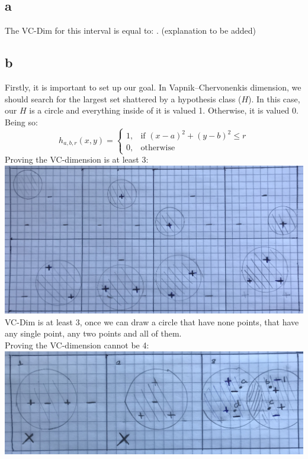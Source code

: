 \subsection{a}
The VC-Dim for this interval is equal to: \textbf{}. (explanation to be added)
\subsection{b}
Firstly, it is important to set up our goal. In Vapnik–Chervonenkis dimension, we should search for the largest set shattered by a hypothesis class ($H$). In this case, our $H$ is a circle and everything inside of it is valued 1. Otherwise, it is valued 0. Being so: \\
$$
h_{a,b,r}(x,y)=
        \begin{cases}
			1, & \text{if $(x-a)^2+(y-b)^2 \leq r$}\\
            0, & \text{otherwise}
		 \end{cases}
$$
\bigbreak
Proving the VC-dimension is at least 3:\\
\bigbreak
\includegraphics[width=\textwidth,height=\textheight,keepaspectratio]{3dim.jpg}\\
\bigbreak
VC-Dim is at least 3, once we can  draw a circle that have none points, that have any single point, any two points and all of them.\\
\bigbreak
Proving the VC-dimension cannot be 4:\\
\bigbreak
\includegraphics[width=\textwidth,height=\textheight,keepaspectratio]{4dim.jpg}
